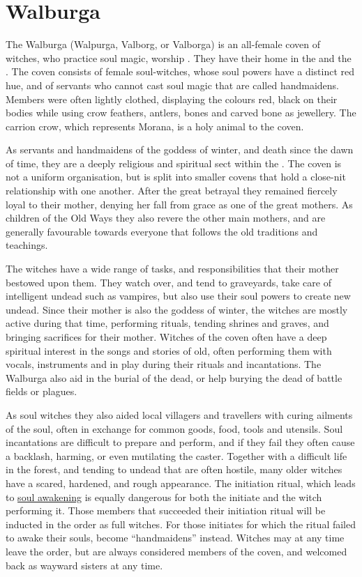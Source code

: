 \section{Walburga}
\label{sec:Walburga}

The Walburga (Walpurga, Valborg, or Valborga) is an all-female coven of
witches, who practice soul magic, worship . They have
their home in the  and the
. The coven consists of female soul-witches, whose soul
powers have a distinct red hue, and of servants who cannot cast soul magic
that are called handmaidens. Members were often lightly clothed, displaying
the colours red, black on their bodies while using crow feathers, antlers,
bones and carved bone as jewellery. The carrion crow, which represents Morana,
is a holy animal to the coven.

As servants and handmaidens of the goddess of winter, and death since the dawn
of time, they are a deeply religious and spiritual sect within the
. The coven is not a uniform organisation, but is
split into smaller covens that hold a close-nit relationship with one another.
After the great betrayal they remained fiercely loyal to their mother, denying
her fall from grace as one of the great mothers. As children of the Old Ways
they also revere the other main mothers, and are generally favourable towards
everyone that follows the old traditions and teachings.

The witches have a wide range of tasks, and responsibilities that their mother
bestowed upon them. They watch over, and tend to graveyards, take care of
intelligent undead such as vampires, but also use their soul powers to create
new undead. Since their mother is also the goddess of winter, the witches are
mostly active during that time, performing rituals, tending shrines and graves,
and bringing sacrifices for their mother. Witches of the coven often have a
deep spiritual interest in the songs and stories of old, often performing them
with vocals, instruments and in play during their rituals and incantations.
The Walburga also aid in the burial of the dead, or help burying the dead of
battle fields or plagues.

As soul witches they also aided local villagers and travellers with curing
ailments of the soul, often in exchange for common goods, food, tools and
utensils. Soul incantations are difficult to prepare and perform, and if they
fail they often cause a backlash, harming, or even mutilating the caster.
Together with a difficult life in the forest, and tending to undead that are
often hostile, many older witches have a scared, hardened, and rough
appearance. The initiation ritual, which leads to \hyperref[sec:Soul
  Awakening]{soul awakening} is equally dangerous for both the initiate and
the witch performing it. Those members that succeeded their initiation ritual
will be inducted in the order as full witches. For those initiates for which
the ritual failed to awake their souls, become ``handmaidens'' instead. Witches
may at any time leave the order, but are always considered members of the coven,
and welcomed back as wayward sisters at any time.

